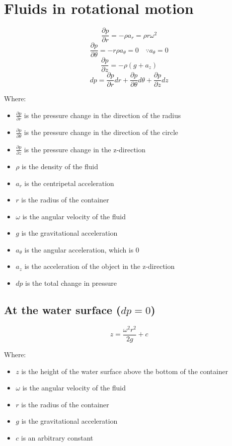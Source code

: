 \documentclass[11pt]{article}
\begin{document}
\newpage

\section{Fluids in rotational motion}
\label{sec:orge1a3403}
\[\frac{\partial p}{\partial r} = - \rho a_r = \rho r \omega^2\]
\[\frac{\partial p}{\partial \theta} = - r\rho a_{\theta} = 0 \quad \because a_{\theta} = 0\]
\[\frac{\partial p}{\partial z} = - \rho (g + a_z)\]
\[dp = \frac{\partial p}{\partial r} dr + \frac{\partial p}{\partial \theta} d \theta + \frac{\partial p}{\partial z} dz\]

Where:
\begin{itemize}
\item \(\frac{\partial p}{\partial r}\) is the pressure change in the direction of the radius
\item \(\frac{\partial p}{\partial \theta}\) is the pressure change in the direction of the circle
\item \(\frac{\partial p}{\partial z}\) is the pressure change in the z-direction
\item \(\rho\) is the density of the fluid
\item \(a_r\) is the centripetal acceleration
\item \(r\) is the radius of the container
\item \(\omega\) is the angular velocity of the fluid
\item \(g\) is the gravitational acceleration
\item \(a_{\theta}\) is the angular acceleration, which is 0
\item \(a_z\) is the acceleration of the object in the z-direction
\item \(dp\) is the total change in pressure
\end{itemize}

\newpage

\subsection{At the water surface (\(dp = 0\))}
\label{sec:orgb52111e}
\[z = \frac{\omega^2 r^2}{2g} + c\]

Where:
\begin{itemize}
\item \(z\) is the height of the water surface above the bottom of the container
\item \(\omega\) is the angular velocity of the fluid
\item \(r\) is the radius of the container
\item \(g\) is the gravitational acceleration
\item \(c\) is an arbitrary constant
\end{itemize}
\end{document}
